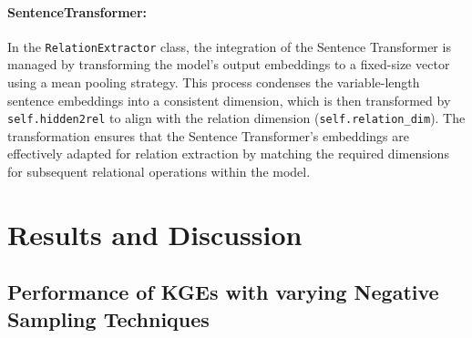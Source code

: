 \documentclass{article}
\begin{document}
\paragraph{\textbf{SentenceTransformer:}} In the \texttt{RelationExtractor} class, the integration of the Sentence Transformer is managed by transforming the model's output embeddings to a fixed-size vector using a mean pooling strategy. This process condenses the variable-length sentence embeddings into a consistent dimension, which is then transformed by \texttt{self.hidden2rel} to align with the relation dimension (\texttt{self.relation\_dim}). The transformation ensures that the Sentence Transformer's embeddings are effectively adapted for relation extraction by matching the required dimensions for subsequent relational operations within the model.

\section{Results and Discussion}

\subsection{Performance of KGEs with varying Negative Sampling Techniques}
\end{document}
